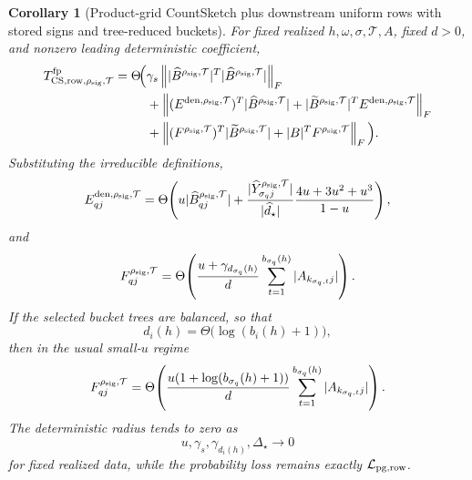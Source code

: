 \documentclass[11pt]{article}
\newcommand{\Frob}[1]{\left\lVert #1\right\rVert_F}
\newtheorem{corollary}[theorem]{Corollary}
\theoremstyle{remark}
\begin{document}
\begin{corollary}[Product-grid CountSketch plus downstream uniform rows with stored signs and tree-reduced buckets]
For fixed realized \(h,\omega,\sigma,\mathcal T,A\), fixed \(d>0\), and
nonzero leading deterministic coefficient,
\[
  \begin{aligned}
  T_{{\rm CS,row},\rho_{\rm sig},\mathcal T}^{\rm fp}
  =
  \Theta\!\Big(
  &\gamma_s
      \Frob{|\widehat B^{\rho_{\rm sig},\mathcal T}|^T
            |\widehat B^{\rho_{\rm sig},\mathcal T}|}
  \\
  &+
    \Frob{(E^{{\rm den},\rho_{\rm sig},\mathcal T})^T
          |\widehat B^{\rho_{\rm sig},\mathcal T}|
          +
          |\widetilde B^{\rho_{\rm sig},\mathcal T}|^T
          E^{{\rm den},\rho_{\rm sig},\mathcal T}}
  \\
  &+
    \Frob{(F^{\rho_{\rm sig},\mathcal T})^T
          |\widetilde B^{\rho_{\rm sig},\mathcal T}|
          +
          |B|^TF^{\rho_{\rm sig},\mathcal T}}
  \Big).
  \end{aligned}
\]
Substituting the irreducible definitions,
\[
  E^{{\rm den},\rho_{\rm sig},\mathcal T}_{qj}
  =
  \Theta\!\left(
    u|\widehat B^{\rho_{\rm sig},\mathcal T}_{qj}|
    +
    \frac{|\widehat Y^{\rho_{\rm sig},\mathcal T}_{\sigma_qj}|}
         {|\widehat d_\star|}
    \frac{4u+3u^2+u^3}{1-u}
  \right),
\]
and
\[
  F^{\rho_{\rm sig},\mathcal T}_{qj}
  =
  \Theta\!\left(
    \frac{u+\gamma_{d_{\sigma_q}(h)}}{d}
    \sum_{t=1}^{b_{\sigma_q}(h)}
      |A_{k_{\sigma_q,t}j}|
  \right).
\]
If the selected bucket trees are balanced, so that
\[
  d_i(h)=\Theta\!\bigl(\log(b_i(h)+1)\bigr),
\]
then in the usual small-\(u\) regime
\[
  F^{\rho_{\rm sig},\mathcal T}_{qj}
  =
  \Theta\!\left(
    \frac{u(1+\log(b_{\sigma_q}(h)+1))}{d}
    \sum_{t=1}^{b_{\sigma_q}(h)}
      |A_{k_{\sigma_q,t}j}|
  \right).
\]
The deterministic radius tends to zero as
\[
  u,\gamma_s,\gamma_{d_i(h)},\Delta_\star\to0
\]
for fixed realized data, while the probability loss remains exactly
\(\mathcal L_{\rm pg,row}\).
\end{corollary}
\end{document}
